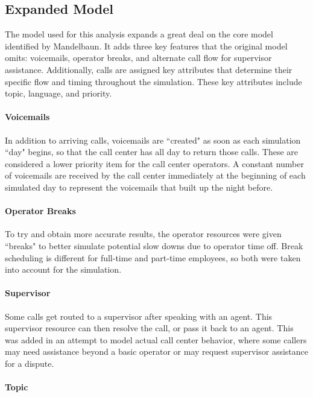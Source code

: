 \documentclass[12pt,twocolumn]{article}
\begin{document}
\subsection{Expanded Model}
The model used for this analysis expands a great deal on the core model identified by Mandelbaun.  It adds three key features that the original model omits: voicemails, operator breaks, and alternate call flow for supervisor assistance.  Additionally, calls are assigned key attributes that determine their specific flow and timing throughout the simulation.  These key attributes include topic, language, and priority.

	\paragraph{Voicemails}
	
In addition to arriving calls, voicemails are ``created" as soon as each simulation ``day" begins, so that the call center has all day to return those calls.  These are considered a lower priority item for the call center operators.  A constant number of voicemails are received by the call center immediately at the beginning of each simulated day to represent the voicemails that built up the night before.

	\paragraph{Operator Breaks}
	
To try and obtain more accurate results, the operator resources were given ``breaks" to better simulate potential slow downs due to operator time off. Break scheduling is different for full-time and part-time employees, so both were taken into account for the simulation.

	\paragraph{Supervisor}
	
Some calls get routed to a supervisor after speaking with an agent.  This supervisor resource can then resolve the call, or pass it back to an agent.  This was added in an attempt to model actual call center behavior, where some callers may need assistance beyond a basic operator or may request supervisor assistance for a dispute. 

	\paragraph{Topic}
\end{document}
